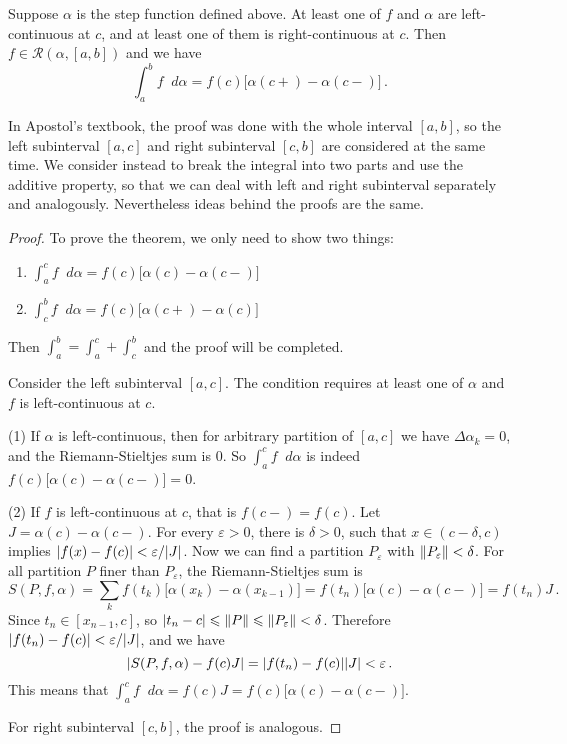 \documentclass{article}
\newcommand{\Riemann}{\mathcal R}
\DeclarePairedDelimiter\abs{\lvert}{\rvert}
\DeclarePairedDelimiter\norm{\lVert}{\rVert}
\newcommand{\dd}{\mathop{}\!d}
\begin{document}
\begin{theorem} \label{thm:step-integrator}
    Suppose $ \alpha $ is the step function defined above. At least one of $ f $ and $ \alpha $ are left-continuous at $ c $, and at least one of them is right-continuous at $ c $. Then $ f \in \Riemann(\alpha, [a, b]) $ and we have
    \[ 
        \int_a^b f \dd \alpha = f(c) \big[ \alpha(c+) - \alpha(c-) \big] \,.
    \]
\end{theorem}

In Apostol's textbook, the proof was done with the whole interval $ [a, b] $, so the left subinterval $ [a, c] $ and right subinterval $ [c, b] $ are considered at the same time. We consider instead to break the integral into two parts and use the additive property, so that we can deal with left and right subinterval separately and analogously. Nevertheless ideas behind the proofs are the same.

\begin{proof}
    To prove the theorem, we only need to show two things:
    \begin{enumerate}
        \item $ \int_a^c f \dd \alpha = f(c) \big[ \alpha(c) - \alpha(c-) \big] $
        \item $ \int_c^b f \dd \alpha = f(c) \big[ \alpha(c+) - \alpha(c) \big] $
    \end{enumerate}
    Then $ \int_a^b = \int_a^c + \int_c^b $ and the proof will be completed.

    Consider the left subinterval $ [a, c] $. The condition requires at least one of $ \alpha $ and $ f $ is left-continuous at $ c $. 

    (1) If $ \alpha $ is left-continuous, then for arbitrary partition of $ [a, c] $ we have $ \Delta \alpha_k = 0 $, and the Riemann-Stieltjes sum is $ 0 $. So $ \int_a^c f \dd \alpha $ is indeed $ f(c) \big[ \alpha(c) - \alpha(c-) \big] = 0 $.

    (2) If $ f $ is left-continuous at $ c $, that is $ f(c-) = f(c) $. Let $ J = \alpha(c) - \alpha(c-) $. For every $ \varepsilon > 0 $, there is $ \delta > 0 $, such that $ x \in (c - \delta, c) $ implies $ \abs{ f(x) - f(c) } < \varepsilon / \abs{ J } $. Now we can find a partition $ P_\varepsilon $ with $ \norm{P_\varepsilon} < \delta $. For all partition $ P $ finer than $ P_\varepsilon $, the Riemann-Stieltjes sum is
    \[ 
        S(P, f, \alpha) = \sum_{k} f(t_k) \big[ \alpha(x_k) - \alpha(x_{k-1}) \big] = f(t_n) \big[ \alpha(c) - \alpha(c-) \big] = f(t_n) J \,.
    \]
    Since $ t_n \in [x_{n-1}, c] $, so $ \abs{ t_n - c } \leqslant \norm{P} \leqslant \norm{P_\varepsilon} < \delta $. Therefore $ \abs{ f(t_n) - f(c) } < \varepsilon / \abs{ J } $, and we have
    \[ 
        \abs{ S(P, f, \alpha) - f(c) J } = \abs{ f(t_n) - f(c) } \abs{ J } < \varepsilon \,.
    \]
    This means that $ \int_a^c f \dd \alpha = f(c) J = f(c) \big[ \alpha(c) - \alpha(c-) \big] $.

    For right subinterval $ [c, b] $, the proof is analogous.
\end{proof}
\end{document}
